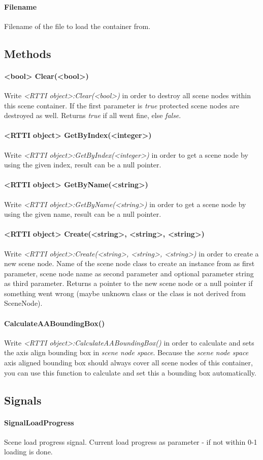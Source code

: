 \paragraph{Filename}
Filename of the file to load the container from.


\subsection{Methods}

\paragraph{<bool> Clear(<bool>)}
Write \emph{<RTTI object>:Clear(<bool>)} in order to destroy all scene nodes within this scene container. If the first parameter is \emph{true} protected scene nodes are destroyed as well. Returns \emph{true} if all went fine, else \emph{false}.

\paragraph{<RTTI object> GetByIndex(<integer>)}
Write \emph{<RTTI object>:GetByIndex(<integer>)} in order to get a scene node by using the given index, result can be a null pointer.

\paragraph{<RTTI object> GetByName(<string>)}
Write \emph{<RTTI object>:GetByName(<string>)} in order to get a scene node by using the given name, result can be a null pointer.

\paragraph{<RTTI object> Create(<string>, <string>, <string>)}
Write \emph{<RTTI object>:Create(<string>, <string>, <string>)} in order to create a new scene node. Name of the scene node class to create an instance from as first parameter, scene node name as second parameter and optional parameter string as third parameter. Returns a pointer to the new scene node or a null pointer if something went wrong (maybe unknown class or the class is not derived from SceneNode).

\paragraph{CalculateAABoundingBox()}
Write \emph{<RTTI object>:CalculateAABoundingBox()} in order to calculate and sets the axis align bounding box in \emph{scene node space}. Because the \emph{scene node space} axis aligned bounding box should always cover all scene nodes of this container, you can use this function to calculate and set this a bounding box automatically.


\subsection{Signals}

\paragraph{SignalLoadProgress}
Scene load progress signal. Current load progress as parameter - if not within 0-1 loading is done.
